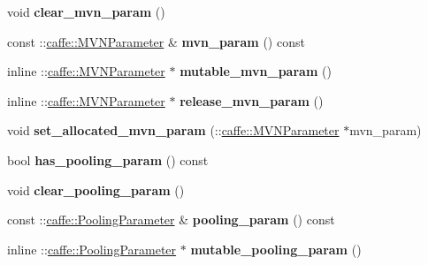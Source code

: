 \begin{DoxyCompactItemize}
void {\bfseries clear\+\_\+mvn\+\_\+param} ()
\item 
\mbox{\label{classcaffe_1_1_v1_layer_parameter_ab06a411df34ec619fecb3f8b64e848c5}} 
const \+::\mbox{\hyperlink{classcaffe_1_1_m_v_n_parameter}{caffe\+::\+M\+V\+N\+Parameter}} \& {\bfseries mvn\+\_\+param} () const
\item 
\mbox{\label{classcaffe_1_1_v1_layer_parameter_aace7c02acdf35ad5c46f1bc5fbe1bc20}} 
inline \+::\mbox{\hyperlink{classcaffe_1_1_m_v_n_parameter}{caffe\+::\+M\+V\+N\+Parameter}} $\ast$ {\bfseries mutable\+\_\+mvn\+\_\+param} ()
\item 
\mbox{\label{classcaffe_1_1_v1_layer_parameter_aa6435e26c9ea84e0d13874751a807e23}} 
inline \+::\mbox{\hyperlink{classcaffe_1_1_m_v_n_parameter}{caffe\+::\+M\+V\+N\+Parameter}} $\ast$ {\bfseries release\+\_\+mvn\+\_\+param} ()
\item 
\mbox{\label{classcaffe_1_1_v1_layer_parameter_ae70b2d9168b17087a3c7a8ebabf2f187}} 
void {\bfseries set\+\_\+allocated\+\_\+mvn\+\_\+param} (\+::\mbox{\hyperlink{classcaffe_1_1_m_v_n_parameter}{caffe\+::\+M\+V\+N\+Parameter}} $\ast$mvn\+\_\+param)
\item 
\mbox{\label{classcaffe_1_1_v1_layer_parameter_ac7e4afa7a78c6acf7140914eb878d0da}} 
bool {\bfseries has\+\_\+pooling\+\_\+param} () const
\item 
\mbox{\label{classcaffe_1_1_v1_layer_parameter_a7f36259cecea61ba9e7918642666679e}} 
void {\bfseries clear\+\_\+pooling\+\_\+param} ()
\item 
\mbox{\label{classcaffe_1_1_v1_layer_parameter_a8bd06b9b8d03608d1d5362d00f28429d}} 
const \+::\mbox{\hyperlink{classcaffe_1_1_pooling_parameter}{caffe\+::\+Pooling\+Parameter}} \& {\bfseries pooling\+\_\+param} () const
\item 
\mbox{\label{classcaffe_1_1_v1_layer_parameter_a30bab8a5465b19111095a396d5d4e6fa}} 
inline \+::\mbox{\hyperlink{classcaffe_1_1_pooling_parameter}{caffe\+::\+Pooling\+Parameter}} $\ast$ {\bfseries mutable\+\_\+pooling\+\_\+param} ()

\end{DoxyCompactItemize}
